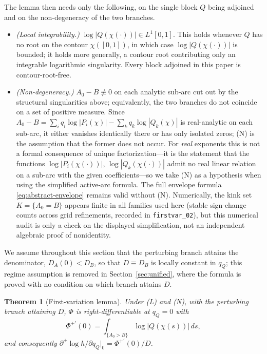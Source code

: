 \documentclass[11pt,reqno]{amsart}
\theoremstyle{plain}
\newtheorem{theorem}{Theorem}
\theoremstyle{definition}
\theoremstyle{remark}
\newcommand{\dplus}{\partial^{+}}
\newcommand{\dA}{D_A}
\newcommand{\dB}{D_B}
\begin{document}
The lemma then needs only the following, on the single block $Q$ being adjoined and on
the non-degeneracy of the two branches.
\begin{itemize}
\item[(L)] \emph{(Local integrability.)} $\log|Q(\chi(\cdot))|\in L^1[0,1]$. This holds
  whenever $Q$ has no root on the contour $\chi([0,1])$, in which case
  $\log|Q(\chi(\cdot))|$ is bounded; it holds more generally, a contour root
  contributing only an integrable logarithmic singularity. Every block adjoined in this
  paper is contour-root-free.
\item[(N)] \emph{(Non-degeneracy.)} $A_0-B\not\equiv0$ on each analytic sub-arc cut out
  by the structural singularities above; equivalently, the two branches do not coincide
  on a set of positive measure. Since $A_0-B=\sum_i q_i\log|P_i(\chi)|-\sum_k
  q_k\log|Q_k(\chi)|$ is real-analytic on each sub-arc, it either vanishes identically
  there or has only isolated zeros; (N) is the assumption that the former does not
  occur. For \emph{real} exponents this is not a formal consequence of unique
  factorization---it is the statement that the functions $\log|P_i(\chi(\cdot))|$,
  $\log|Q_k(\chi(\cdot))|$ admit no real linear relation on a sub-arc with the given
  coefficients---so we take (N) as a hypothesis when using the simplified active-arc
  formula.  The full envelope formula \eqref{eq:abstract-envelope} remains valid without
  (N).  Numerically, the kink set $K=\{A_0=B\}$ appears finite in all families used here
  (stable sign-change counts across grid refinements, recorded in
  \texttt{firstvar\_02}), but this numerical audit is only a check on the displayed
  simplification, not an independent algebraic proof of nonidentity.
\end{itemize}
We assume throughout this section that the perturbing branch attains the denominator,
$\dA(0)<\dB$, so that $D\equiv\dB$ is locally constant in $q_Q$; this regime
assumption is removed in Section~\ref{sec:unified}, where the formula is proved with no
condition on which branch attains $D$.

\begin{theorem}[First-variation lemma]\label{thm:firstvar}
Under \emph{(L)} and \emph{(N)}, with the perturbing branch attaining $D$, $\Phi$ is
right-differentiable at $q_Q=0$ with
\begin{equation}\label{eq:Phiprime}
  \Phi^{+\prime}(0)=\int_{\{A_0>B\}}\log|Q(\chi(s))|\,ds,
\end{equation}
and consequently $\dplus\!\log h/\partial q_Q|_0=\Phi^{+\prime}(0)/D$.
\end{theorem}
\end{document}
